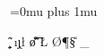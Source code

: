 \makeatletter
{}
{
    \usepackage{etoolbox}

    \Urlmuskip=0mu plus 1mu

    \makeatletter
        \g@addto@macro{\UrlBreaks}{\UrlOrds}
    \makeatother

    \makeatletter
    \g@addto@macro{\UrlBreaks}
    {%
        \do\a\do\b\do\c\do\d\do\e\do\f\do\g%
        \do\h\do\i\do\j\do\k\do\l\do\m\do\n%
        \do\o\do\p\do\q\do\r\do\s\do\t\do\u%
        \do\v\do\w\do\x\do\y\do\z%
        \do\A\do\B\do\C\do\D\do\E\do\F\do\G%
        \do\H\do\I\do\J\do\K\do\L\do\M\do\N%
        \do\O\do\P\do\Q\do\R\do\S\do\T\do\U%
        \do\V\do\W\do\X\do\Y\do\Z%
        \do\/\do\_\do\-
    }
    \makeatother
}{}
\makeatother




